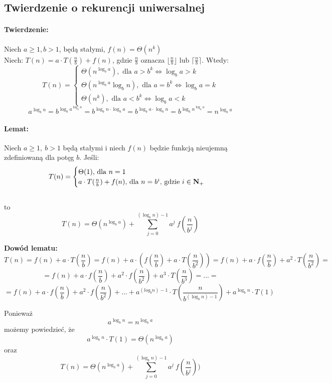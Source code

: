 \subsection{Twierdzenie o rekurencji uniwersalnej}
\paragraph{Twierdzenie:}
Niech $a \geq 1, b > 1$, będą stałymi, $f(n) = \Theta(n^k)$\\
Niech: $T(n) = a \cdot T(\frac{n}{b})+f(n)$, gdzie $\frac{n}{b}$ oznacza $\lfloor \frac{n}{b} \rfloor $ lub $\lceil \frac{n}{b} \rceil$. Wtedy:
$$
  T(n)=\begin{cases}
               \Theta(n^{\log_b a}), \text{ dla } a > b^k \Leftrightarrow \log_b a>k\\
               \Theta(n^{\log_b a} \log_b n), \text{ dla } a=b^k \Leftrightarrow \log_b a=k\\
               \Theta(n^k), \text{ dla } a<b^k \Leftrightarrow \log_b a<k
		\end{cases}
$$
$$a^{\log_b n}=b^{\log_b a^{\log_b n}}=b^{\log_b n \cdot \log_b a}=b^{\log_b a \cdot \log_b n}=b^{\log_b n^{\log_b a}}=n^{\log_b a}$$

\paragraph{Lemat: }Niech $a\geq 1,\ b>1$ będą stałymi i niech $f(n)$ będzie funkcją nieujemną zdefiniowaną dla potęg $b$.
Jeśli: 
\[
T(n)=\begin{cases}
	\Theta(1), $ dla $ n=1 \\
    a \cdot T(\frac{n}{b}) + f(n),$ dla $ n=b^i, $ gdzie $i \in \mathbf{N}_+
\end{cases}
\]\\
to\
$$T(n) = \Theta(n^{\log_b a}) + \sum_{j=0}^{(\log_b n)-1} a^j\ f(\frac{n}{b^j})$$

\textbf{Dowód lematu: }
$$T(n)= f(n) + a \cdot T(\frac{n}{b})= f(n) + a \cdot (f(\frac{n}{b}) + a  \cdot T(\frac{n}{b^2})) = f(n) + a \cdot f(\frac{n}{b}) + a^2 \cdot T(\frac{n}{b^2}) = $$
$$= f(n) + a \cdot f(\frac{n}{b}) + a^2 \cdot f(\frac{n}{b^2}) + a^3  \cdot T(\frac{n}{b^3}) = ... =$$
$$= f(n) + a \cdot f(\frac{n}{b}) + a^2 \cdot f(\frac{n}{b^2}) + ... + a^{(log_b n)-1} \cdot T(\frac{n}{b^{(\log_b n) - 1}}) + a^{\log_b n} \cdot T(1)$$

Ponieważ $$a^{\log_b n}=n^{\log_b a}$$ możemy powiedzieć, że $$a^{\log_b n} \cdot T(1) = \Theta(n^{\log_b a})$$
oraz $$T(n) = \Theta(n^{\log_b a})+\sum_{j=0}^{(\log_b n)-1} a^j\ f(\frac{n}{b^j}))$$

